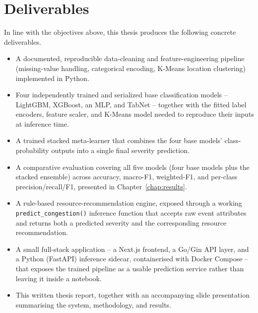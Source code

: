 \section{Deliverables}

In line with the objectives above, this thesis produces the following concrete deliverables.

\begin{itemize}
\item A documented, reproducible data-cleaning and feature-engineering pipeline (missing-value handling, categorical encoding, K-Means location clustering) implemented in Python.
\item Four independently trained and serialized base classification models -- LightGBM, XGBoost, an MLP, and TabNet -- together with the fitted label encoders, feature scaler, and K-Means model needed to reproduce their inputs at inference time.
\item A trained stacked meta-learner that combines the four base models' class-probability outputs into a single final severity prediction.
\item A comparative evaluation covering all five models (four base models plus the stacked ensemble) across accuracy, macro-F1, weighted-F1, and per-class precision/recall/F1, presented in Chapter~\ref{chap:results}.
\item A rule-based resource-recommendation engine, exposed through a working \texttt{predict\_congestion()} inference function that accepts raw event attributes and returns both a predicted severity and the corresponding resource recommendation.
\item A small full-stack application -- a Next.js frontend, a Go/Gin API layer, and a Python (FastAPI) inference sidecar, containerised with Docker Compose -- that exposes the trained pipeline as a usable prediction service rather than leaving it inside a notebook.
\item This written thesis report, together with an accompanying slide presentation summarising the system, methodology, and results.
\end{itemize}
